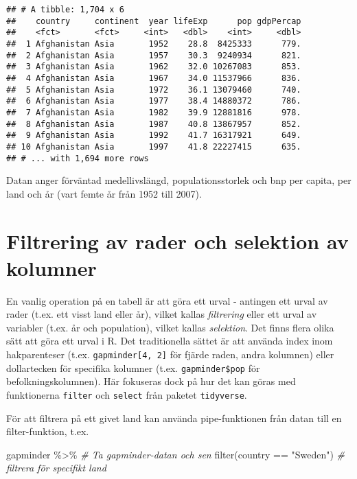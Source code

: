 \documentclass[
]{book}
\newenvironment{Shaded}{\begin{snugshade}}{\end{snugshade}}
\newcommand{\CommentTok}[1]{\textcolor[rgb]{0.56,0.35,0.01}{\textit{#1}}}
\newcommand{\FunctionTok}[1]{\textcolor[rgb]{0.00,0.00,0.00}{#1}}
\newcommand{\NormalTok}[1]{#1}
\newcommand{\SpecialCharTok}[1]{\textcolor[rgb]{0.00,0.00,0.00}{#1}}
\newcommand{\StringTok}[1]{\textcolor[rgb]{0.31,0.60,0.02}{#1}}
\theoremstyle{definition}
\theoremstyle{definition}
\theoremstyle{definition}
\theoremstyle{definition}
\theoremstyle{remark}
\begin{document}
\begin{verbatim}
## # A tibble: 1,704 x 6
##    country     continent  year lifeExp      pop gdpPercap
##    <fct>       <fct>     <int>   <dbl>    <int>     <dbl>
##  1 Afghanistan Asia       1952    28.8  8425333      779.
##  2 Afghanistan Asia       1957    30.3  9240934      821.
##  3 Afghanistan Asia       1962    32.0 10267083      853.
##  4 Afghanistan Asia       1967    34.0 11537966      836.
##  5 Afghanistan Asia       1972    36.1 13079460      740.
##  6 Afghanistan Asia       1977    38.4 14880372      786.
##  7 Afghanistan Asia       1982    39.9 12881816      978.
##  8 Afghanistan Asia       1987    40.8 13867957      852.
##  9 Afghanistan Asia       1992    41.7 16317921      649.
## 10 Afghanistan Asia       1997    41.8 22227415      635.
## # ... with 1,694 more rows
\end{verbatim}

Datan anger förväntad medellivslängd, populationsstorlek och bnp per capita, per land och år (vart femte år från 1952 till 2007).

\hypertarget{filtrering-av-rader-och-selektion-av-kolumner}{%
\section{Filtrering av rader och selektion av kolumner}\label{filtrering-av-rader-och-selektion-av-kolumner}}

En vanlig operation på en tabell är att göra ett urval - antingen ett urval av rader (t.ex. ett visst land eller år), vilket kallas \emph{filtrering} eller ett urval av variabler (t.ex. år och population), vilket kallas \emph{selektion}.
Det finns flera olika sätt att göra ett urval i R.
Det traditionella sättet är att använda index inom hakparenteser (t.ex. \texttt{gapminder{[}4,\ 2{]}} för fjärde raden, andra kolumnen) eller dollartecken för specifika kolumner (t.ex. \texttt{gapminder\$pop} för befolkningskolumnen).
Här fokuseras dock på hur det kan göras med funktionerna \texttt{filter} och \texttt{select} från paketet \texttt{tidyverse}.

För att filtrera på ett givet land kan använda pipe-funktionen från datan till en filter-funktion, t.ex.

\begin{Shaded}
\begin{Highlighting}[]
\NormalTok{gapminder }\SpecialCharTok{\%\textgreater{}\%}                 \CommentTok{\# Ta gapminder{-}datan och sen}
  \FunctionTok{filter}\NormalTok{(country }\SpecialCharTok{==} \StringTok{"Sweden"}\NormalTok{) }\CommentTok{\# filtrera för specifikt land}
\end{Highlighting}
\end{Shaded}
\end{document}
